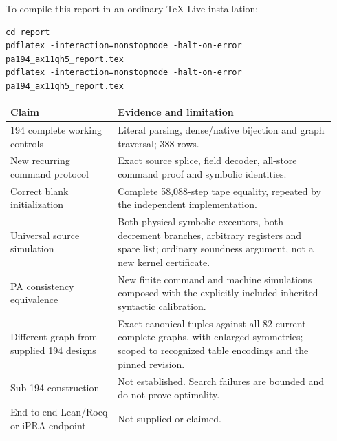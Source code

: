 \documentclass[11pt,letterpaper]{article}
\begin{document}
To compile this report in an ordinary TeX Live installation:
\begin{verbatim}
cd report
pdflatex -interaction=nonstopmode -halt-on-error pa194_ax11qh5_report.tex
pdflatex -interaction=nonstopmode -halt-on-error pa194_ax11qh5_report.tex
\end{verbatim}

\begin{longtable}{@{}p{0.31\linewidth}p{0.63\linewidth}@{}}
\toprule Claim & Evidence and limitation\\\midrule\endhead
194 complete working controls & Literal parsing, dense/native bijection and graph traversal; 388 rows.\\[4pt]
New recurring command protocol & Exact source splice, field decoder, all-store command proof and symbolic identities.\\[4pt]
Correct blank initialization & Complete 58,088-step tape equality, repeated by the independent implementation.\\[4pt]
Universal source simulation & Both physical symbolic executors, both decrement branches, arbitrary registers and spare list; ordinary soundness argument, not a new kernel certificate.\\[4pt]
PA consistency equivalence & New finite command and machine simulations composed with the explicitly included inherited syntactic calibration.\\[4pt]
Different graph from supplied 194 designs & Exact canonical tuples against all 82 current complete graphs, with enlarged symmetries; scoped to recognized table encodings and the pinned revision.\\[4pt]
Sub-194 construction & Not established. Search failures are bounded and do not prove optimality.\\[4pt]
End-to-end Lean/Rocq or iPRA endpoint & Not supplied or claimed.\\
\bottomrule
\end{longtable}
\end{document}
